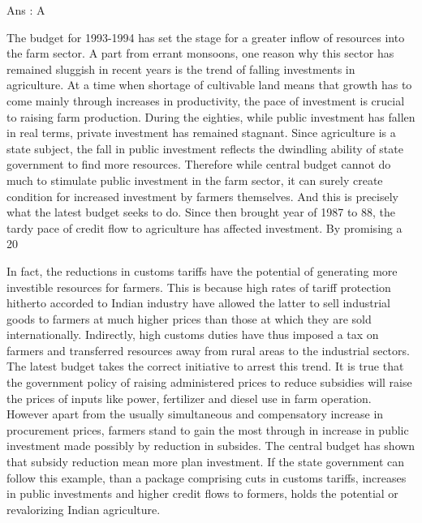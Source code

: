     Ans : A 


The budget for 1993-1994 has set the stage for a greater inflow of resources into the farm sector. A part from errant monsoons, one reason why this sector has remained sluggish in recent years is the trend of falling investments in agriculture. At a time when shortage of cultivable land means that growth has to come mainly through increases in productivity, the pace of investment is crucial to raising farm production. During the eighties, while public investment has fallen in real terms, private investment has remained stagnant. Since agriculture is a state subject, the fall in public investment reflects the dwindling ability of state government to find more resources. Therefore while central budget cannot do much to stimulate public investment in the farm sector, it can surely create condition for increased investment by farmers themselves. And this is precisely what the latest budget seeks to do. Since then brought year of 1987 to 88, the tardy pace of credit flow to agriculture has affected investment. By promising a 20%

In fact, the reductions in customs tariffs have the potential of generating more investible resources for farmers. This is because high rates of tariff protection hitherto accorded to Indian industry have allowed the latter to sell industrial goods to farmers at much higher prices than those at which they are sold internationally. Indirectly, high customs duties have thus imposed a tax on farmers and transferred resources away from rural areas to the industrial sectors. The latest budget takes the correct initiative to arrest this trend. It is true that the government policy of raising administered prices to reduce subsidies will raise the prices of inputs like power, fertilizer and diesel use in farm operation. However apart from the usually simultaneous and compensatory increase in procurement prices, farmers stand to gain the most through in increase in public investment made possibly by reduction in subsides. The central budget has shown that subsidy reduction mean more plan investment. If the state government can follow this example, than a package comprising cuts in customs tariffs, increases in public investments and higher credit flows to formers, holds the potential or revalorizing Indian agriculture.

